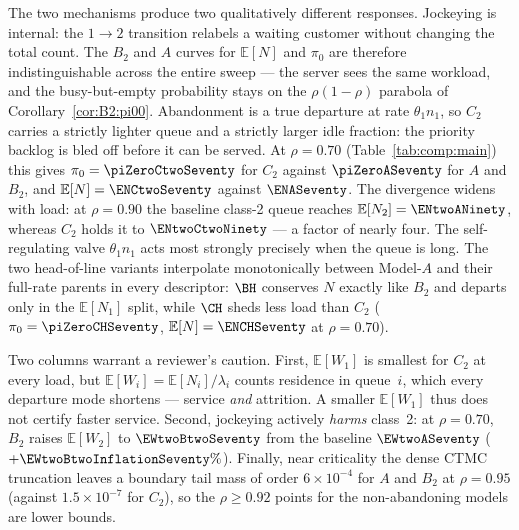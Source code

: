 

The two mechanisms produce two qualitatively different responses. Jockeying is internal: the
$1\!\to\!2$ transition relabels a waiting customer without changing the total count. The
$B_2$ and $A$ curves for $\mathbb{E}[N]$ and $\pi_0$ are therefore indistinguishable across the entire
sweep --- the server sees the same workload, and the busy-but-empty probability stays on the
$\rho(1-\rho)$ parabola of Corollary~\ref{cor:B2:pi00}. Abandonment is a true departure at
rate $\theta_1 n_1$, so $C_2$ carries a strictly lighter queue and a strictly larger idle
fraction: the priority backlog is bled off before it can be served. At $\rho=0.70$
(Table~\ref{tab:comp:main}) this gives $\pi_0=\piZeroCtwoSeventy$ for $C_2$ against $\piZeroASeventy$ for $A$ and
$B_2$, and $\mathbb{E}[N]=\ENCtwoSeventy$ against $\ENASeventy$. The divergence widens with load: at
$\rho=0.90$ the baseline class-2 queue reaches $\mathbb{E}[N_2]=\ENtwoANinety$, whereas $C_2$ holds
it to $\ENtwoCtwoNinety$ --- a factor of nearly four. The self-regulating valve $\theta_1 n_1$
acts most strongly precisely when the queue is long. The two head-of-line variants interpolate
monotonically between Model-$A$ and their full-rate parents in every descriptor: $\BH$ conserves
$N$ exactly like $B_2$ and departs only in the $\mathbb{E}[N_1]$ split, while $\CH$ sheds less
load than $C_2$ ($\pi_0=\piZeroCHSeventy$, $\mathbb{E}[N]=\ENCHSeventy$ at $\rho=0.70$).

Two columns warrant a reviewer's caution. First, $\mathbb{E}[W_1]$ is smallest for $C_2$ at
every load, but $\mathbb{E}[W_i]=\mathbb{E}[N_i]/\lambda_i$ counts residence in queue~$i$, which
every departure mode shortens --- service \emph{and} attrition. A smaller $\mathbb{E}[W_1]$ thus
does not certify faster service. Second, jockeying actively \emph{harms} class~2: at $\rho=0.70$,
$B_2$ raises $\mathbb{E}[W_2]$ to $\EWtwoBtwoSeventy$ from the baseline $\EWtwoASeventy$
($+\EWtwoBtwoInflationSeventy\%$). Finally, near criticality the dense CTMC truncation leaves a
boundary tail mass of order $6\times10^{-4}$ for $A$ and $B_2$ at $\rho=0.95$ (against
$1.5\times10^{-7}$ for $C_2$), so the $\rho\ge0.92$ points for the non-abandoning models are
lower bounds.
